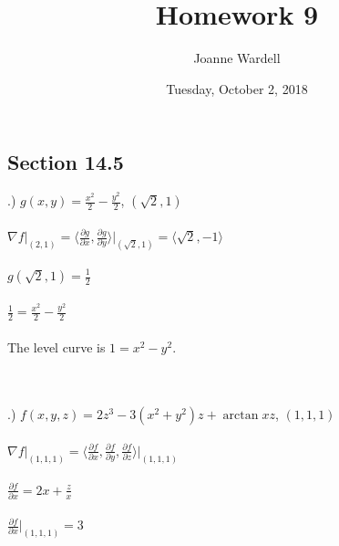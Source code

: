 \documentclass[12pt]{article}
\title{\vspace{-2.0cm}Homework 9}
\author{Joanne Wardell}
\date{Tuesday, October 2, 2018}
\begin{document}
\maketitle

\subsection*{Section 14.5}

.) $g(x,y) = \frac{x^{2}}{2} -\frac{y^{2}}{2}$, \hspace{10pt} $(\sqrt{2},1)$\\\\
\noindent $\nabla f \Big|_{(2,1)} = \langle \frac{\partial g}{\partial x}, \frac{\partial g}{\partial y} \rangle \Big|_{(\sqrt{2}, 1)}
= \langle \sqrt{2}, -1\rangle$\\\\
\noindent $g(\sqrt{2}, 1) = \frac{1}{2}$\\\\
\noindent $\frac{1}{2} = \frac{x^{2}}{2} - \frac{y^{2}}{2}$\\\\
\noindent The level curve is $1 = x^{2} - y^{2}$.\\


\\\\






.) $f(x, y, z) = 2z^{3} - 3(x^{2} + y^{2})z +\arctan{xz}$, \hspace{10pt} $(1,1,1)$\\\\
\noindent $\nabla f \Big|_{(1,1,1)} = \langle \frac{\partial f}{\partial x}, \frac{\partial f}{\partial y}, \frac{\partial f}{\partial z} \rangle \Big|_{(1,1,1)}$\\\\
\noindent $\frac{\partial f}{\partial x} = 2x + \frac{z}{x}$\\\\
\noindent $\frac{\partial f}{\partial x}\Big|_{(1, 1, 1)} = 3$\\\\
\end{document}
